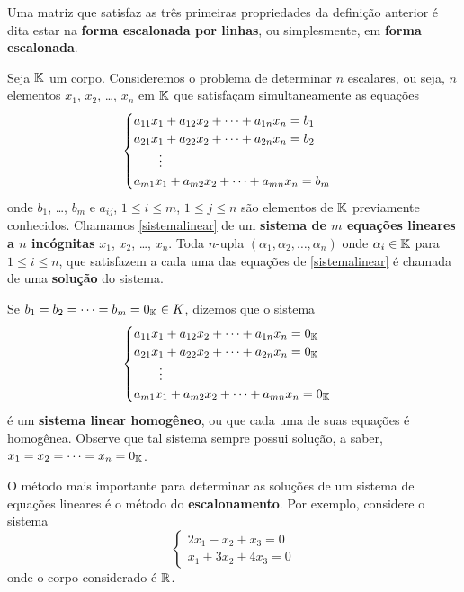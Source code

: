 \begin{observacao}
    Uma matriz que satisfaz as três primeiras propriedades da definição anterior  é dita estar na \textbf{forma escalonada por linhas},  ou simplesmente, em \textbf{forma escalonada}.
\end{observacao}

Seja $\mathbb{K}$ um corpo. Consideremos o problema de determinar $n$ escalares, ou seja, $n$ elementos $x_1$, $x_2$, \dots, $x_n$ em $\mathbb{K}$ que satisfa\c{c}am simultaneamente as equa\c{c}\~oes
\begin{equation}\label{sistemalinear}\index{Sistema Linear}
	\begin{cases}
		a_{11}x_1 + a_{12}x_2 + \cdots + a_{1n}x_n = b_1\\
		a_{21}x_1 + a_{22}x_2 + \cdots + a_{2n}x_n = b_2\\
		\qquad \vdots\\
		a_{m1}x_1 + a_{m2}x_2 + \cdots + a_{mn}x_n = b_m\\
	\end{cases}
\end{equation}
onde $b_1$, \dots, $b_m$ e $a_{ij}$, $1 \le i \le m$, $1 \le j \le n$ s\~ao elementos de $\mathbb{K}$ previamente conhecidos. Chamamos \eqref{sistemalinear} de um \textbf{sistema de $m$ equa\c{c}\~oes lineares a $n$ inc\'ognitas} $x_1$, $x_2$, \dots, $x_n$. Toda $n$-upla $(\alpha_1, \alpha_2, \dots, \alpha_n)$ onde $\alpha_i \in \mathbb{K}$ para $1 \le i \le n$, que satisfazem a cada uma das equa\c{c}\~oes de \eqref{sistemalinear} \'e chamada de uma \textbf{solu\c{c}\~ao} do sistema.

Se $b_1 = b_2 = \cdots = b_m = 0_{\mathbb{K}} \in K$, dizemos que o sistema
\begin{equation}\label{sistemalinearhomogeneo}\index{Sistema Linear}
	\begin{cases}
		a_{11}x_1 + a_{12}x_2 + \cdots + a_{1n}x_n = 0_\cp{K}\\
		a_{21}x_1 + a_{22}x_2 + \cdots + a_{2n}x_n = 0_\cp{K}\\
		\qquad \vdots\\
		a_{m1}x_1 + a_{m2}x_2 + \cdots + a_{mn}x_n = 0_\cp{K}\\
	\end{cases}
\end{equation}
\'e um \textbf{sistema linear homog\^eneo}, ou que cada uma de suas equa\c{c}\~oes \'e homog\^enea. Observe que tal sistema sempre possui solu\c{c}\~ao, a saber, $x_1 = x_2 = \cdots = x_n = 0_{\mathbb{K}}$.

O m\'etodo mais importante para determinar as solu\c{c}\~oes de um sistema de equa\c{c}\~oes lineares \'e o m\'etodo do \textbf{escalonamento}. Por exemplo, considere o sistema
\begin{equation}\label{exemploplo1}
	\begin{cases}
		2x_1 - x_2 + x_3 = 0\\
		x_1 + 3x_2 + 4x_ 3 = 0
	\end{cases}
\end{equation}
onde o corpo considerado \'e $\mathbb{R}$.

